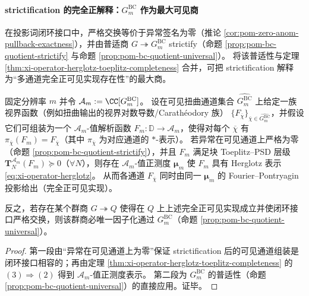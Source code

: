 \paragraph{strictification 的完全正解释：\texorpdfstring{$G^{\mathrm{BC}}_m$}{GBCm} 作为最大可见商}
在投影词闭环接口中，严格交换等价于异常签名为零（推论 \ref{cor:pom-zero-anom-pullback-exactness}），并由普适商 \(G\twoheadrightarrow G^{\mathrm{BC}}_m\) strictify（命题 \ref{prop:pom-bc-quotient-strictify} 与命题 \ref{prop:pom-bc-quotient-universal}）。
将该普适性与定理 \ref{thm:xi-operator-herglotz-toeplitz-completeness} 合并，可把 strictification 解释为“多通道完全正可见实现存在性”的最大商。

\begin{theorem}\label{thm:xi-gbc-maximal-cp-visible-realization}
固定分辨率 \(m\) 并令 \(\mathcal{A}_m:=\CC[G^{\mathrm{BC}}_m]\)。
设在可见扭曲通道集合 \(\widehat{G^{\mathrm{BC}}_m}\) 上给定一族视界函数（例如扭曲输出的视界对数导数/Carath\'eodory 族）
\(\{F_{\overline\chi}\}_{\overline\chi\in\widehat{G^{\mathrm{BC}}_m}}\)，并假设它们可组装为一个 \(\mathcal{A}_m\)-值解析函数 \(F_m:\mathbb{D}\to\mathcal{A}_m\)，使得对每个 \(\overline\chi\) 有 \(\pi_{\overline\chi}(F_m)=F_{\overline\chi}\)（其中 \(\pi_{\overline\chi}\) 为对应通道的 \(\ast\)-表示）。
若异常在可见通道上严格为零（命题 \ref{prop:pom-bc-quotient-strictify}），并且 \(F_m\) 满足块 Toeplitz--PSD 层级 \(\mathbf{T}^{\mathcal{A}_m}_N(F_m)\succeq 0\)（\(\forall N\)），则存在 \(\mathcal{A}_m\)-值正测度 \(\boldsymbol\mu_m\) 使 \(F_m\) 具有 Herglotz 表示 \eqref{eq:xi-operator-herglotz}。
从而各通道 \(F_{\overline\chi}\) 同时由同一 \(\boldsymbol\mu_m\) 的 Fourier--Pontryagin 投影给出（完全正可见实现）。
\par
反之，若存在某个群商 \(G\twoheadrightarrow Q\) 使得在 \(Q\) 上上述完全正可见实现成立并使闭环接口严格交换，则该群商必唯一因子化通过 \(G^{\mathrm{BC}}_m\)（命题 \ref{prop:pom-bc-quotient-universal}）。
\end{theorem}

\begin{proof}
第一段由“异常在可见通道上为零”保证 strictification 后的可见通道组装是闭环接口相容的；再由定理 \ref{thm:xi-operator-herglotz-toeplitz-completeness} 的 \((3)\Rightarrow(2)\) 得到 \(\mathcal{A}_m\)-值正测度表示。
第二段为 \(G^{\mathrm{BC}}_m\) 的普适性（命题 \ref{prop:pom-bc-quotient-universal}）的直接应用。证毕。
\end{proof}

